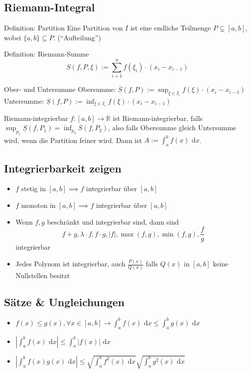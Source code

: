 \documentclass[a4paper,10pt]{article}
\def\R{\mathbb{R}}
\def\dx{\text{ d}x}
\begin{document}
\subsection{Riemann-Integral}
\begin{subbox}{Definition: Partition}
	Eine Partition von $I$ ist eine endliche Teilmenge $P \subsetneq [a,b]$, wobei $\{a,b\} \subseteq P$. (``Aufteilung'')
\end{subbox}
\begin{mainbox}{Definition: Riemann-Summe}
	$$S(f, P, \xi) := \sum_{i=1}^n f(\xi_i) \cdot (x_i - x_{i-1})$$
\end{mainbox}
\begin{subbox}{Ober- und Untersumme}
	Obersumme: $\overline{S}(f,P) := \sup_{\xi \in I_i} f(\xi) \cdot (x_i - x_{i-1})$ \\
	Untersumme: $\underline{S}(f,P) := \inf_{\xi \in I_i} f(\xi) \cdot (x_i - x_{i-1})$
\end{subbox}
\begin{mainbox}{Riemann-integrierbar}
	$f:[a,b] \to \R$ ist Riemann-integrierbar, falls $\sup_{p_1} \underline{S}(f,P_1) = \inf_{p_2}\overline{S}(f, P_2)$, also falls Obersumme gleich Untersumme wird, wenn die Partition feiner wird. Dann ist $A := \int_a^b f(x)\dx$.
\end{mainbox}

\subsection{Integrierbarkeit zeigen}
\begin{itemize}
	\item $f$ stetig in $[a,b] \implies f$ integrierbar über $[a,b]$
	\item $f$ monoton in $[a,b] \implies f$ integrierbar über $[a,b]$
	\item Wenn $f,g$ beschränkt und integrierbar sind, dann sind
	      $$f+g, \lambda \cdot f, f \cdot g, |f|, \max(f,g), \min(f,g), \frac{f}{g}$$ integrierbar
	\item Jedes Polynom ist integrierbar, auch $\frac{P(x)}{Q(x)}$ falls $Q(x)$ in $[a,b]$ keine Nullstellen besitzt
\end{itemize}

\subsection{Sätze \& Ungleichungen}
\begin{itemize}
	\item $f(x) \le g(x), \forall x \in [a,b] \rightarrow \int_a^b f(x) \dx \le \int_a^b g(x) \dx$
	\item $\left|\int_a^b f(x) \dx\right| \le \int_a^b |f(x)| \dx$
	\item $\left|\int_a^b f(x) g(x) \dx \right| \le \sqrt{\int_a^b f^2(x) \dx} \sqrt{\int_a^b g^2(x) \dx}$
\end{itemize}
\end{document}
